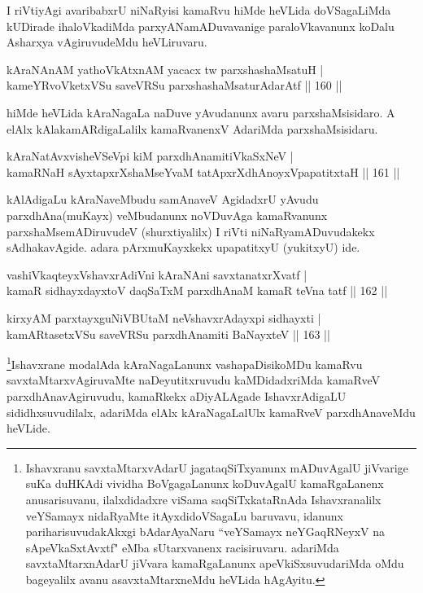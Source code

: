 \begin{artha}
I riVtiyAgi avaribabxrU niNaRyisi kamaRvu hiMde heVLida doVSagaLiMda kUDirade 
ihaloVkadiMda parxyANamADuvavanige paraloVkavanunx koDalu Asharxya vAgiruvudeMdu 
heVLiruvaru.
\end{artha}

\begin{shl}
kAraNAnAM yathoVkAtxnAM yacacx tw parxshashaMsatuH |\\
kameYRvoVketxVSu saveVRSu parxshashaMsaturAdarAtf \hfill || 160 ||
\end{shl}

\begin{artha}
hiMde heVLida kAraNagaLa naDuve yAvudanunx avaru parxshaMsisidaro. A elAlx kAlakamARdigaLalilx kamaRvanenxV AdariMda parxshaMsisidaru.
\end{artha}

\begin{shl}
kAraNatAvxvisheVSeV\s pi kiM parxdhAnamitiVkaSxNeV |\\
kamaRNaH sAyxtapxrXshaMseYvaM tatApxrXdhAnoyxVpapatitxtaH \hfill || 161 ||
\end{shl}

\begin{artha}
kAlAdigaLu kAraNaveMbudu samAnaveV AgidadxrU yAvudu parxdhAna\break (muKayx) veMbudanunx noVDuvAga kamaRvanunx parxshaMsemADiruvudeV (shurxtiyalilx) I riVti niNaRyamADuvudakekx sAdhakavAgide. adara pArxmuKayxkekx upapatitxyU (yukitxyU) ide.
\end{artha}


\begin{shl}
vashiVkaqteyxVshavxrAdiVni kAraNAni savxtanatxrXvatf |\\
kamaR sidhayxdayxtoV daqSaTxM parxdhAnaM kamaR teVna tatf \hfill || 162 ||
\end{shl}

\begin{shl}
kirxyAM parxtayxguNiVBUtaM neVshavxrAdayxpi sidhayxti |\\
kamARtasetxVSu saveVRSu parxdhAnamiti BaNayxteV \hfill || 163 ||
\end{shl}

\begin{artha}
\footnote{Ishavxranu savxtaMtarxvAdarU jagataqSiTxyanunx mADuvAgalU jiVvarige suKa duHKAdi vividha BoVgagaLanunx koDuvAgalU kamaRgaLanenx anusarisuvanu, ilalxdidadxre viSama saqSiTxkataRnAda Ishavxranalilx veYSamayx nidaRyaMte itAyxdidoVSagaLu baruvavu, idanunx pariharisuvudakAkxgi bAdarAyaNaru ``veYSamayx neYGaqRNeyxV na sApeVkaSxtAvxtf" eMba sUtarxvanenx racisiruvaru. adariMda savxtaMtarxnAdarU jiVvara kamaRgaLanunx apeVkiSxsuvudariMda oMdu bageyalilx avanu asavxtaMtarxneMdu heVLida hAgAyitu.}Ishavxrane modalAda kAraNagaLanunx vashapaDisikoMDu kamaRvu savxtaMtarxvAgiruvaMte naDeyutitxruvudu kaMDidadxriMda kamaRveV parxdhAnavAgiruvudu, kamaRkekx aDiyALAgade IshavxrAdigaLU sididhxsuvudilalx, adariMda elAlx kAraNagaLalUlx kamaRveV parxdhAnaveMdu heVLide.
\end{artha}

